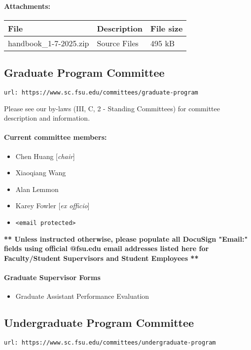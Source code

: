\documentclass[12pt,a4paper]{article}
\begin{document}
\paragraph{Attachments:}
\begin{center}
\begin{tabular}{ l l l }
\hline
\textbf{File} & \textbf{Description} & \textbf{File size} \\
\hline
handbook\_1-7-2025.zip & Source Files & 495 kB \\
\hline
\end{tabular}
\end{center}

\subsection{Graduate Program Committee}
\texttt{url: https://www.sc.fsu.edu/committees/graduate-program}

Please see our by-laws (III, C, 2 - Standing Committees) for committee description and information.

\paragraph{Current committee members:}
\begin{itemize}
    \item Chen Huang [\textit{chair}]
    \item Xiaoqiang Wang
    \item Alan Lemmon
    \item Karey Fowler [\textit{ex officio}]
    \item \texttt{<email protected>}
\end{itemize}
\textbf{** Unless instructed otherwise, please populate all DocuSign "Email:" fields using official @fsu.edu email addresses listed here for Faculty/Student Supervisors and Student Employees **}

\paragraph{Graduate Supervisor Forms}
\begin{itemize}
    \item Graduate Assistant Performance Evaluation
\end{itemize}

\subsection{Undergraduate Program Committee}
\texttt{url: https://www.sc.fsu.edu/committees/undergraduate-program}
\end{document}
